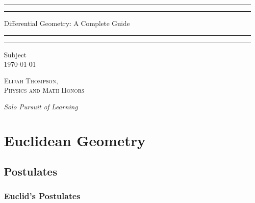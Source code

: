 \documentclass[12pt]{report}
\begin{document}

\begin{titlepage}
    \centering
    \scshape
    \vspace*{\baselineskip}
    \rule{\textwidth}{1.6pt}\vspace*{-\baselineskip}\vspace*{2pt}
    \rule{\textwidth}{0.4pt}
    
    \vspace{0.75\baselineskip}
    
    {\LARGE Differential Geometry: A Complete Guide}
    
    \vspace{0.75\baselineskip}
    
    \rule{\textwidth}{0.4pt}\vspace*{-\baselineskip}\vspace{3.2pt}
    \rule{\textwidth}{1.6pt}
    
    \vspace{2\baselineskip}
    Subject \\
    \vspace*{3\baselineskip}
    \monthdayyeardate\today \\
    \vspace*{5.0\baselineskip}
    
    {\scshape\Large Elijah Thompson, \\ Physics and Math Honors\\}
    
    \vspace{1.0\baselineskip}
    \textit{Solo Pursuit of Learning}
\end{titlepage}

\tableofcontents

\part{Euclidean Geometry}

\chapter{Postulates}

\section{Euclid's Postulates}
\end{document}
